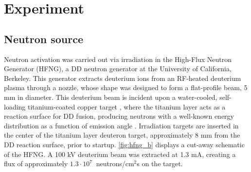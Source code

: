 \documentclass[5p]{elsarticle}
\newcommand{\sci}[2]{ #1 \cdot 10^{#2}\ }
\newcommand{\comment}[1]{\todo[color=blue!20!white,inline]{ASV: #1}}
\begin{document}
\section{Experiment}\label{sec:experiment}



\subsection{Neutron source}\label{sec:n_source}



Neutron activation was carried out via irradiation in the High-Flux Neutron Generator (HFNG), a DD neutron generator at the University of California, Berkeley.
This generator extracts deuterium ions from an RF-heated deuterium plasma through a nozzle, whose shape was designed to form a flat-profile beam, 5 mm in diameter.
This deuterium beam is incident upon a water-cooled, self-loading titanium-coated copper target \cite{Waltz2017,Waltz2016a}, where the titanium layer acts as a reaction surface for DD fusion, producing neutrons with a well-known energy distribution as a function of  emission angle \cite{Liskien_Paulsen_1973}.
Irradiation targets are inserted in the center of the titanium layer deuteron target, approximately 8 mm from the DD reaction surface, prior to startup.
\autoref{fig:hfng_b} displays a cut-away schematic of the HFNG.
A 100 kV deuterium beam was extracted at 1.3 mA, creating a flux of approximately  $\sci{1.3}{7}$ neutrons/cm$^2$s on the target.
\end{document}
